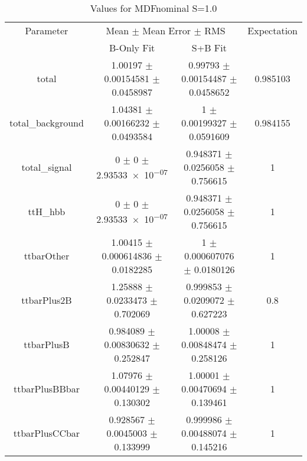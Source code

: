 \begin{table}
\centering
\caption{Values for MDFnominal S=1.0}
\begin{tabular}{cccc}
\toprule
Parameter & \multicolumn{2}{c}{Mean $\pm$ Mean Error $\pm$ RMS} & Expectation\\
 & B-Only Fit & S+B Fit & \\
\midrule
total & \num{1.00197} $\pm$ \num{0.00154581} $\pm$ \num{0.0458987} & \num{0.99793} $\pm$ \num{0.00154487} $\pm$ \num{0.0458652} & \num{0.985103}\\
total\_background & \num{1.04381} $\pm$ \num{0.00166232} $\pm$ \num{0.0493584} & \num{1} $\pm$ \num{0.00199327} $\pm$ \num{0.0591609} & \num{0.984155}\\
total\_signal & \num{0} $\pm$ \num{0} $\pm$ \num{2.93533e-07} & \num{0.948371} $\pm$ \num{0.0256058} $\pm$ \num{0.756615} & \num{1}\\
ttH\_hbb & \num{0} $\pm$ \num{0} $\pm$ \num{2.93533e-07} & \num{0.948371} $\pm$ \num{0.0256058} $\pm$ \num{0.756615} & \num{1}\\
ttbarOther & \num{1.00415} $\pm$ \num{0.000614836} $\pm$ \num{0.0182285} & \num{1} $\pm$ \num{0.000607076} $\pm$ \num{0.0180126} & \num{1}\\
ttbarPlus2B & \num{1.25888} $\pm$ \num{0.0233473} $\pm$ \num{0.702069} & \num{0.999853} $\pm$ \num{0.0209072} $\pm$ \num{0.627223} & \num{0.8}\\
ttbarPlusB & \num{0.984089} $\pm$ \num{0.00830632} $\pm$ \num{0.252847} & \num{1.00008} $\pm$ \num{0.00848474} $\pm$ \num{0.258126} & \num{1}\\
ttbarPlusBBbar & \num{1.07976} $\pm$ \num{0.00440129} $\pm$ \num{0.130302} & \num{1.00001} $\pm$ \num{0.00470694} $\pm$ \num{0.139461} & \num{1}\\
ttbarPlusCCbar & \num{0.928567} $\pm$ \num{0.0045003} $\pm$ \num{0.133999} & \num{0.999986} $\pm$ \num{0.00488074} $\pm$ \num{0.145216} & \num{1}\\
\bottomrule
\end{tabular}
\end{table}